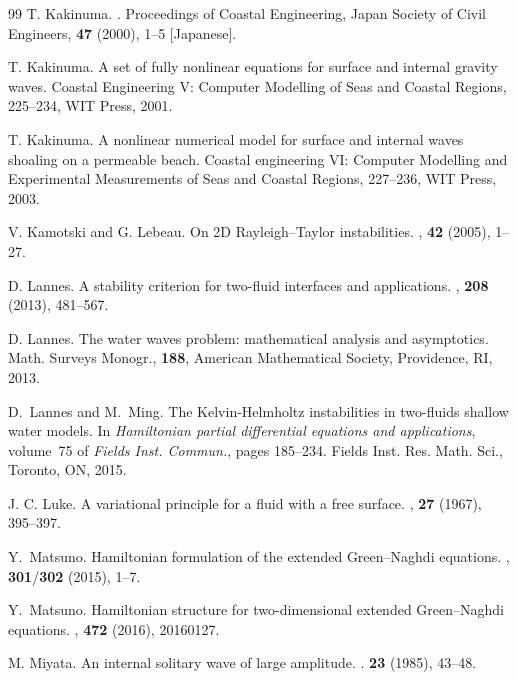 \documentclass[11pt,leqno]{article}
\numberwithin{equation}{section}
\numberwithin{figure}{section}
\begin{document}
\begin{thebibliography}{99}
T. Kakinuma. 
. 
\newblock Proceedings of Coastal Engineering, Japan Society of Civil Engineers, {\bf 47} (2000), 1--5 [Japanese]. 

T. Kakinuma. 
\newblock A set of fully nonlinear equations for surface and internal gravity waves. 
\newblock Coastal Engineering V: Computer Modelling of Seas and Coastal Regions, 225--234, WIT Press, 2001. 

T. Kakinuma. 
\newblock A nonlinear numerical model for surface and internal waves shoaling on a permeable beach. 
\newblock Coastal engineering VI: Computer Modelling and Experimental Measurements of Seas and Coastal Regions, 227--236, WIT Press, 2003.

V. Kamotski and G. Lebeau. 
\newblock On 2D Rayleigh--Taylor instabilities. 
, {\bf 42} (2005), 1--27. 

D. Lannes. 
\newblock A stability criterion for two-fluid interfaces and applications. 
, {\bf 208} (2013), 481--567. 

D. Lannes. 
\newblock The water waves problem: mathematical analysis and asymptotics. 
\newblock Math. Surveys Monogr., {\bf 188}, American Mathematical Society, Providence, RI, 2013.

D.~Lannes and M.~Ming. 
\newblock The {K}elvin-{H}elmholtz instabilities in two-fluids shallow water models.
\newblock In {\em Hamiltonian partial differential equations and applications},
volume~75 of {\em Fields Inst. Commun.}, pages 185--234. Fields Inst. Res. Math. Sci., Toronto, ON, 2015.

J. C. Luke. 
\newblock A variational principle for a fluid with a free surface. 
, {\bf 27} (1967), 395--397. 

Y.~Matsuno.
\newblock Hamiltonian formulation of the extended Green--Naghdi equations. 
, {\bf 301}/{\bf 302} (2015), 1--7.

Y.~Matsuno.
\newblock Hamiltonian structure for two-dimensional extended Green--Naghdi equations. 
, {\bf 472} (2016), 20160127.

M. Miyata.
\newblock  An internal solitary wave of large amplitude. 
. {\bf 23} (1985), 43--48.


\end{thebibliography}
\end{document}
